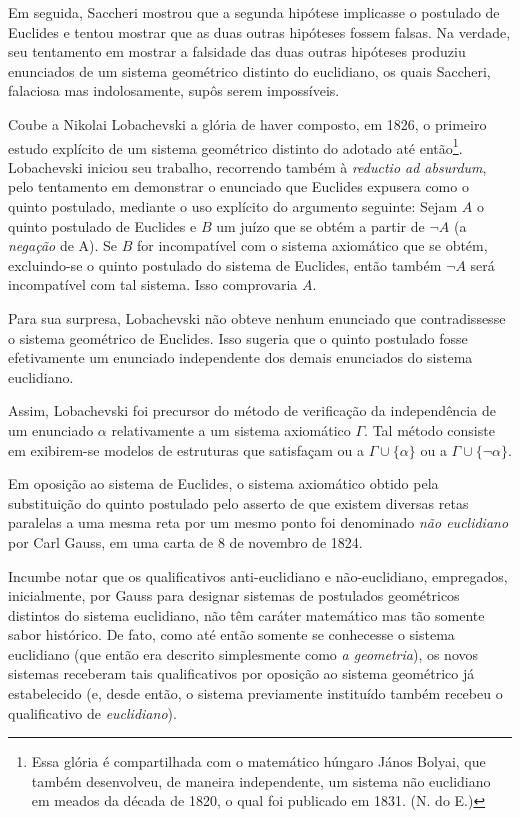 \documentclass{hipatia}
\begin{document}
Em seguida, Saccheri mostrou que a segunda hipótese implicasse o postulado de Euclides e tentou mostrar que as duas outras hipóteses fossem falsas. Na verdade, seu tentamento em mostrar a falsidade das duas outras hipóteses produziu enunciados de um sistema geométrico distinto do euclidiano, os quais Saccheri, falaciosa mas indolosamente, supôs serem impossíveis.  \cite[p. 182]{kneebone1963}

Coube a Nikolai Lobachevski a glória de haver composto, em 1826, o primeiro estudo explícito de um sistema geométrico distinto do adotado até então\footnote{
Essa glória é compartilhada com o matemático húngaro
János Bolyai, que também desenvolveu, de maneira independente, um sistema não euclidiano em meados da década de 1820, o qual foi publicado em 1831.  
(N. do E.)}. Lobachevski iniciou seu trabalho, recorrendo também à \emph{reductio ad absurdum}, pelo tentamento em demonstrar o enunciado que Euclides expusera como o quinto postulado, mediante o uso explícito do argumento seguinte: Sejam $A$ o quinto postulado de Euclides e $B$ um juízo que se obtém a partir de $\neg A$  (a \emph{negação} de A). Se $B$ for incompatível com o sistema axiomático que se obtém, excluindo-se o quinto postulado do sistema de Euclides, então também $\neg A$ será incompatível com tal sistema. Isso comprovaria $A$.   \cite[p. 29]{bachelard1934}\cite[p. 388]{kneale}\cite[p. 13--14]{smogorzhevski1976}      

Para sua surpresa, Lobachevski não obteve nenhum enunciado que contradissesse o sistema geométrico de Euclides. Isso sugeria que o quinto postulado fosse efetivamente um enunciado independente dos demais enunciados do sistema euclidiano. 

Assim, Lobachevski foi precursor do método de verificação da independência de um enunciado $\alpha$ relativamente a um sistema axiomático $\Gamma$. Tal método consiste em exibirem-se modelos de estruturas que satisfaçam ou a $\Gamma\cup\{\alpha\}$ ou a $\Gamma\cup\{\neg\alpha\}$. 


Em oposição ao sistema de Euclides, o sistema axiomático obtido pela substituição do quinto postulado pelo asserto de que existem diversas retas paralelas a uma mesma reta por um mesmo ponto foi denominado \emph{não euclidiano} por Carl Gauss, em uma carta de 8 de novembro de 1824.  \cite[p. 39]{barbosa1995} 

Incumbe notar que os qualificativos anti-euclidiano e não-euclidiano, empregados, inicialmente, por Gauss para designar sistemas de postulados geométricos distintos do sistema euclidiano, não têm caráter matemático mas tão somente sabor histórico. De fato, como até então somente se conhecesse o sistema euclidiano  (que então era descrito simplesmente como \emph{a geometria}), os novos sistemas receberam tais qualificativos por oposição ao sistema geométrico já estabelecido (e, desde então, o sistema previamente instituído também recebeu o qualificativo de \emph{euclidiano}). 
\end{document}
